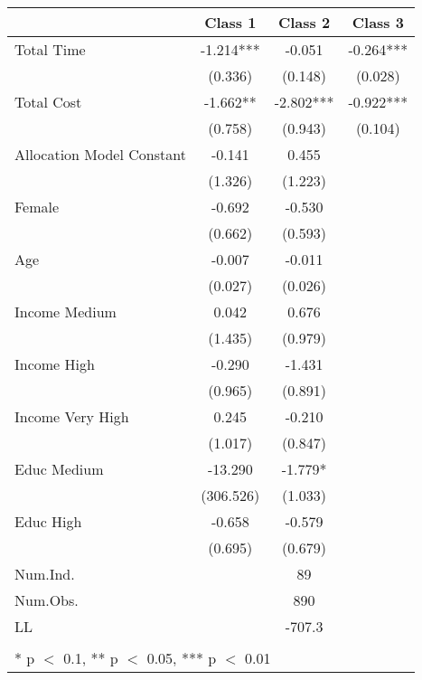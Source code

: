 \begin{table}[H]
\centering
\begin{tabular}[t]{lccc}
\toprule
  & Class 1 & Class 2 & Class 3\\
\midrule
Total Time & -1.214*** & -0.051 & -0.264***\\
 & (0.336) & (0.148) & (0.028)\\
Total Cost & -1.662** & -2.802*** & -0.922***\\
 & (0.758) & (0.943) & (0.104)\\
Allocation Model Constant & -0.141 & 0.455 & \\
 & (1.326) & (1.223) & \\
Female & -0.692 & -0.530 & \\
 & (0.662) & (0.593) & \\
Age & -0.007 & -0.011 & \\
 & (0.027) & (0.026) & \\
Income Medium & 0.042 & 0.676 & \\
 & (1.435) & (0.979) & \\
Income High & -0.290 & -1.431 & \\
 & (0.965) & (0.891) & \\
Income Very High & 0.245 & -0.210 & \\
 & (1.017) & (0.847) & \\
Educ Medium & -13.290 & -1.779* & \\
 & (306.526) & (1.033) & \\
Educ High & -0.658 & -0.579 & \\
 & (0.695) & (0.679) & \\
\midrule
Num.Ind. &  & 89 & \\
Num.Obs. &  & 890 & \\
LL &  & -707.3 & \\
 &  &  & \\
\bottomrule
\multicolumn{4}{l}{\textsuperscript{} * p $<$ 0.1, ** p $<$ 0.05, *** p $<$ 0.01}\\
\end{tabular}
\end{table}
